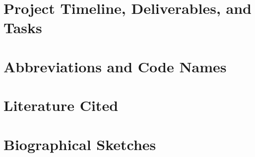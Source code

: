 \documentclass{DOEproposal}
\begin{document}
    \section{Project Timeline, Deliverables, and Tasks}
        \label{sec:timetable}
        
    \newpage


    \section{Abbreviations and Code Names}
        \label{sec:abbreviations}
        
    \newpage

    \section{Literature Cited}
        \label{sec:references}
        
    \newpage
   

    \section{Biographical Sketches}
        \label{sec:biosketches}
        
    
\end{document}
